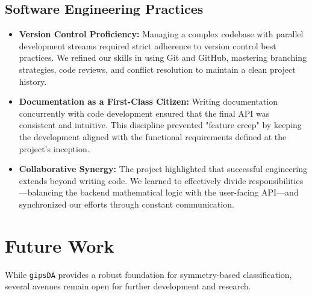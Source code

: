 \documentclass[a4paper,11pt,twoside]{report}
\theoremstyle{definition}
\begin{document}
\subsection{Software Engineering Practices}
\begin{itemize}
    \item \textbf{Version Control Proficiency:} Managing a complex codebase with parallel development streams required strict adherence to version control best practices. We refined our skills in using Git and GitHub, mastering branching strategies, code reviews, and conflict resolution to maintain a clean project history.
    \item \textbf{Documentation as a First-Class Citizen:} Writing documentation concurrently with code development ensured that the final API was consistent and intuitive. This discipline prevented "feature creep" by keeping the development aligned with the functional requirements defined at the project's inception.
    \item \textbf{Collaborative Synergy:} The project highlighted that successful engineering extends beyond writing code. We learned to effectively divide responsibilities—balancing the backend mathematical logic with the user-facing API—and synchronized our efforts through constant communication.
\end{itemize}

\section{Future Work}
\label{sec:future_work}

While \texttt{gipsDA} provides a robust foundation for symmetry-based classification, several avenues remain open for further development and research.
\end{document}
